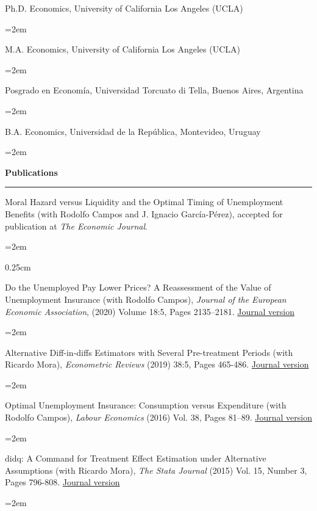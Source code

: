 \documentclass[12pt]{article}
\newcommand{\sepspace}{\vspace*{0.5em}}		%
\newcommand{\NewPart}[1]{ \vspace*{0.4cm} \noindent \large \textbf{#1}
\par \normalsize \normalfont \vspace*{-0.5cm} \noindent\rule{\textwidth}{1.8pt} \vspace*{-0.75cm} }
\newcommand{\EducationEntry}[4]{
		\noindent #1 \hfill      %
		\noindent #2 %
		\par  %
		\noindent \textit{#3} \par        %
		\noindent\hangindent=2em\hangafter=0  #4 %
		\normalsize \par}
\begin{document}
\EducationEntry{Ph.D. Economics, University of California Los Angeles (UCLA)}{2008}{}{}

\EducationEntry{M.A. Economics, University of California Los Angeles (UCLA)}{2004}{}{}

\EducationEntry{Posgrado en Econom\'ia, Universidad Torcuato di Tella, Buenos Aires, Argentina}{2001}{}{}

\EducationEntry{B.A. Economics, Universidad de la República, Montevideo, Uruguay}{1999}{}{}

\vspace*{-0.5cm}
\NewPart{Publications}{}

\vspace*{0.25cm}

\EducationEntry{Moral Hazard versus Liquidity and the Optimal Timing of Unemployment Benefits (with Rodolfo Campos and J. Ignacio García-Pérez), accepted for publication at \textit{The Economic Journal}.}{}{}

\vspace*{0.25cm}

\EducationEntry{Do the Unemployed Pay Lower Prices? A Reassessment of the Value of Unemployment Insurance (with Rodolfo Campos), \textit{Journal of the European Economic Association}, (2020) Volume 18:5, Pages 2135–2181.} {\href{https://academic.oup.com/jeea/advance-article/doi/10.1093/jeea/jvz043/5607409?guestAccessKey=14e0bd06-6410-43f0-aa64-677e87dfef66}{Journal version}}{}{}

\vspace*{-0.25cm}


\EducationEntry{Alternative Diff-in-diffs Estimators with Several Pre-treatment Periods (with Ricardo Mora), \textit{Econometric Reviews} (2019) 38:5, Pages 465-486.}{\href{http://www.tandfonline.com/doi/abs/10.1080/07474938.2017.1348683}{Journal version}}{}{}

\vspace*{-0.25cm}

\EducationEntry{Optimal Unemployment Insurance: Consumption versus Expenditure (with Rodolfo Campos), \textit{Labour Economics} (2016) Vol. 38, Pages 81–89.}{\href{https://www.sciencedirect.com/science/article/abs/pii/S0927537115001232}{Journal version}}{}{}

\vspace*{-0.25cm}

\EducationEntry{didq: A Command for Treatment Effect Estimation under Alternative Assumptions (with Ricardo Mora), \textit{The Stata Journal} (2015) Vol. 15, Number 3, Pages 796-808. \href{https://www.stata-journal.com/article.html?article=st0405}{Journal version}}{}{}{}
\end{document}
